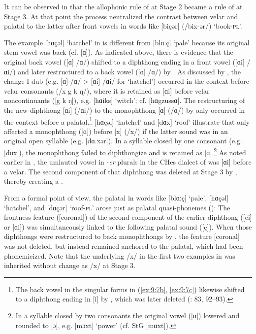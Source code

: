 It can be observed in  that the allophonic rule of  at Stage 2 became a rule of  at Stage 3. At that point the process neutralized the contrast between velar and palatal to the latter after front vowels in words like [biçər] (/bix-ər/) ‘book-\textsc{pl}’.

The example [hɑçəl] ‘hatchel’ in  is different from [blɑːç] ‘pale’ because its original stem vowel was back (cf.  [ɑ]). As indicated above, there is evidence that the original back vowel ([ɑ] /ɑ/) shifted to a diphthong ending in  a front vowel ([ɑi] /ɑi/) and later restructured to a back vowel ([ɑ] /ɑ/) by . As discussed by \citet[74]{Kroh1915}, the change I dub  (e.g. [ɑ] /ɑ/ > [ɑi] /ɑi/ for ‘hatchel’) occurred in the context before velar consonants (/x g k ŋ/), where it is retained as [ɑi] before velar noncontinuants ([g k ŋ]), e.g. [hɑiks] ‘witch’; cf.  [hɑgzussɑ]. The restructuring of the new diphthong [ɑi] (/ɑi/) to the monophthong [ɑ] (/ɑ/) by  only occurred in the context before a palatal.\footnote{{The back vowel in the singular forms in (\ref{ex:9:7b}, \ref{ex:9:7c}) likewise shifted to a diphthong ending in [i] by , which was later deleted (\citealt{Kroh1915}: 83, 92--93).} } [hɑçəl] ‘hatchel’ and [dɑx] ‘roof’ illustrate that  only affected a monophthong ([ɑ]) before [x] (/x/) if the latter sound was in an original open syllable (e.g. [dɑ.xər]). In a syllable closed by one consonant (e.g. [dɑx]), the monophthong failed to diphthongize and is retained as [ɑ].\footnote{{In a syllable closed by two consonants the original vowel ([ɑ]) lowered and rounded to [ɔ], e.g.  [mɔxt] ‘power’ (cf. StG [mɑxt]).}} As noted earlier in , the umlauted vowel in -\textit{er} plurals in the CHes dialect of  was [ɑi] before a velar. The second component of that diphthong was deleted at Stage 3 by , thereby creating a .

From a formal point of view, the palatal in words like [blɑːç] ‘pale’, [hɑçəl]  ‘hatchel’, and [dɑçər] ‘roof-\textsc{pl}’ arose just as palatal quasi-phonemes (): The frontness feature ([coronal]) of the second component of the earlier diphthong ([ei] or [ɑi]) was simultaneously linked to the following palatal sound ([ç]). When those diphthongs were restructured to back monophthongs by , the feature [coronal] was not deleted, but instead remained anchored to the palatal, which had been phonemicized. Note that the underlying /x/ in the first two examples in  was inherited without change as /x/ at Stage 3.

